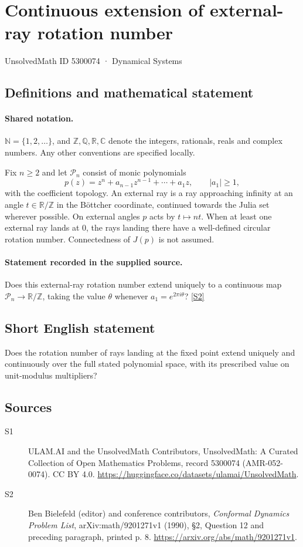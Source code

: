 \documentclass[11pt]{article}
\newcommand{\sref}[2]{\hyperlink{source:#1:#2}{[S#2]}}
\begin{document}
\setcounter{section}{5300073}
\section{Continuous extension of external-ray rotation number}\label{5300074}
{\small\sffamily UnsolvedMath ID 5300074 · Dynamical Systems}
\subsection{Definitions and mathematical statement}

\paragraph{Shared notation.}$\mathbb N=\{1,2,\ldots\}$, and $\mathbb Z,\mathbb Q,\mathbb R,\mathbb C$ denote the integers, rationals, reals and complex numbers. Any other conventions are specified locally.


Fix $n\geq2$ and let $\mathcal P_n$ consist of monic polynomials
\[p(z)=z^n+a_{n-1}z^{n-1}+\cdots+a_1z,\qquad |a_1|\geq1,\]
with the coefficient topology. An external ray is a ray approaching infinity at an angle $t\in\mathbb R/\mathbb Z$ in the Böttcher coordinate, continued towards the Julia set wherever possible. On external angles $p$ acts by $t\mapsto nt$. When at least one external ray lands at $0$, the rays landing there have a well-defined circular rotation number. Connectedness of $J(p)$ is not assumed.
\paragraph{Statement recorded in the supplied source.}
Does this external-ray rotation number extend uniquely to a continuous map $\mathcal P_n\to\mathbb R/\mathbb Z$, taking the value $\theta$ whenever $a_1=e^{2\pi i\theta}$? \sref{5300074}{2}
\subsection{Short English statement}
Does the rotation number of rays landing at the fixed point extend uniquely and continuously over the full stated polynomial space, with its prescribed value on unit-modulus multipliers?
\subsection{Sources}
\begin{description}
\item[\hypertarget{source:5300074:1}{S1}] ULAM.AI and the UnsolvedMath Contributors, UnsolvedMath: A Curated Collection of Open Mathematics Problems, record 5300074 (AMR-052-0074). CC BY 4.0. \url{https://huggingface.co/datasets/ulamai/UnsolvedMath}.
\item[\hypertarget{source:5300074:2}{S2}] Ben Bielefeld (editor) and conference contributors, \emph{Conformal Dynamics Problem List}, arXiv:math/9201271v1 (1990), \S2, Question 12 and preceding paragraph, printed p. 8. \url{https://arxiv.org/abs/math/9201271v1}.
\end{description}
\label{end:5300074}
\end{document}

